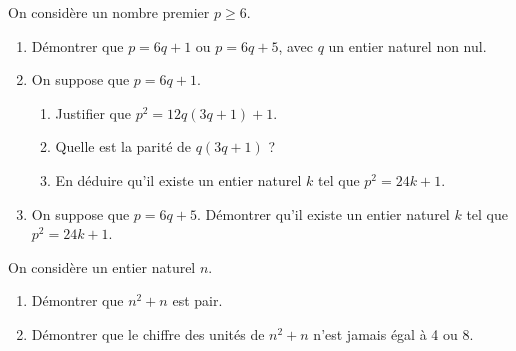 {On considère un nombre premier $p \geq 6$. 
\begin{enumerate}
\item Démontrer que $p=6q+1$ ou $p=6q+5$, avec $q$ un entier naturel non nul.
\item On suppose que $p=6q+1$.
  \begin{enumerate}
  \item Justifier que $p^2=12q(3q+1)+1$. 
  \item Quelle est la parité de $q(3q+1)$ ?
  \item En déduire qu'il existe un entier naturel $k$ tel que $p^2 = 24k +1$.
  \end{enumerate}
\item On suppose que $p=6q+5$. Démontrer qu'il existe un entier naturel $k$ tel que $p^2 = 24k +1$.
 \end{enumerate}


On considère un entier naturel $n$.
  \begin{enumerate}
  \item Démontrer que $n^2+n$ est pair. 
  \item Démontrer que le chiffre des unités de $n^2+n$ n'est jamais égal à 4 ou 8.
  \end{enumerate}
 
}



